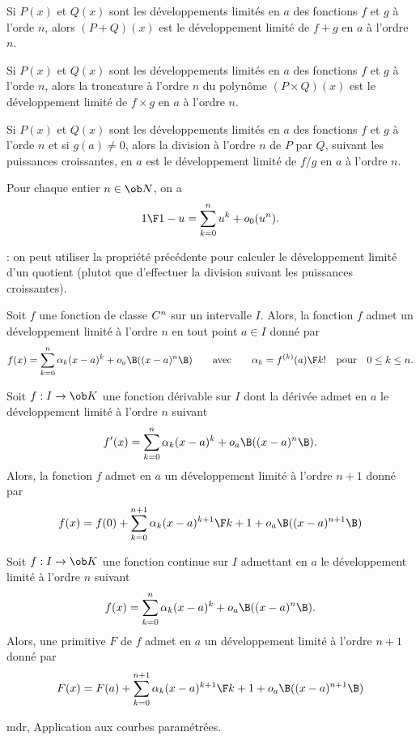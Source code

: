 \Propriete []  Si $P(x)$ et $Q(x)$ sont les d\'eveloppements limit\'es en $a$ des fonctions $f$ et $g$ \`a l'orde $n$, 
alors $(P+Q)(x)$ est le d\'eveloppement limit\'e de $f+g$ en $a$ \`a l'ordre $n$. 
\bigskip


\Propriete []  Si $P(x)$ et $Q(x)$ sont les d\'eveloppements limit\'es en $a$ des fonctions $f$ et $g$ \`a l'orde $n$, 
alors la troncature \`a l'ordre $n$ du polyn\^ome $(P\times Q)(x)$ est le d\'eveloppement limit\'e de $f\times g$ en $a$ \`a l'ordre $n$. 
\bigskip


\Propriete []  Si $P(x)$ et $Q(x)$ sont les d\'eveloppements limit\'es en $a$ des fonctions $f$ et $g$ \`a l'orde $n$ 
et si $g(a)\neq0$, alors la division \`a l'ordre $n$ de $P$ par $Q$, suivant les puissances croissantes, 
en $a$ est le d\'eveloppement limit\'e de $f/g$ en $a$ \`a l'ordre $n$. 
\bigskip

\Propriete []  Pour chaque entier $n\in\ob N$, on a 
$$
{1\F 1-u}=\sum_{k=0}^nu^k+o_0(u^n).
$$

\Remarque : on peut utiliser la propri\'et\'e pr\'ec\'edente pour calculer le d\'eveloppement limit\'e d'un quotient (plutot que d'effectuer la division suivant les puissances croissantes). 
\bigskip

\Theoreme [Title=Formule de Taylor Young] 
Soit $f$ une fonction de classe $\sc C^n$ sur un intervalle $I$. 
Alors, la fonction $f$ admet un d\'eveloppement limit\'e \`a l'ordre $n$ en tout point $a\in I$ donn\'e par 
$$
f(x)=\sum_{k=0}^n\alpha_k(x-a)^k+o_a\B((x-a)^n\B)\qquad \mbox{avec}\qquad \alpha_k={f^{(k)}(a)\F k!}\quad\mbox{pour}\quad 0\le k\le n. 
$$

\Propriete []  Soit $f:I\to\ob K$ une fonction d\'erivable sur $I$ dont la d\'eriv\'ee admet en $a$ le d\'eveloppement limit\'e \`a l'ordre $n$ suivant 
$$
f'(x)=\sum_{k=0}^n\alpha_k(x-a)^k+o_a\B((x-a)^n\B).
$$
Alors, la fonction $f$ admet en $a$ un d\'eveloppement limit\'e \`a l'ordre $n+1$ donn\'e par 
$$
f(x)=f(0)+\sum_{k=0}^{n+1}\alpha_k{(x-a)^{k+1}\F k+1}+o_a\B((x-a)^{n+1}\B)
$$

\Propriete []  Soit $f:I\to\ob K$ une fonction continue sur $I$ admettant en $a$ le d\'eveloppement limit\'e \`a l'ordre $n$ suivant 
$$
f(x)=\sum_{k=0}^n\alpha_k(x-a)^k+o_a\B((x-a)^n\B).
$$
Alors, une primitive $F$ de $f$ admet en $a$ un d\'eveloppement limit\'e \`a l'ordre $n+1$ donn\'e par 
$$
F(x)=F(a)+\sum_{k=0}^{n+1}\alpha_k{(x-a)^{k+1}\F k+1}+o_a\B((x-a)^{n+1}\B)
$$

\Section mdr, Application aux courbes param\'etr\'ees. 

